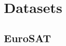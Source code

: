 \documentclass[a4paper, oneside, english]{sapthesis} %
\begin{document}
\chapter{Datasets} %

\section{EuroSAT}\label{EuroSAT}
\end{document}
